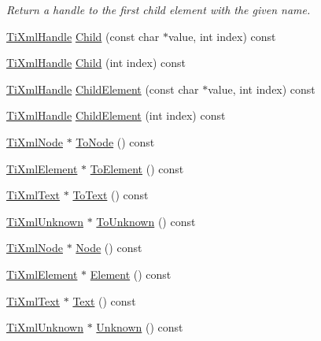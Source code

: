 \begin{DoxyCompactItemize}
\begin{DoxyCompactList}\small\item\em Return a handle to the first child element with the given name. \item\end{DoxyCompactList}\item 
\hyperlink{class_ti_xml_handle}{TiXmlHandle} \hyperlink{class_ti_xml_handle_a072492b4be1acdb0db2d03cd8f71ccc4}{Child} (const char $\ast$value, int index) const 
\item 
\hyperlink{class_ti_xml_handle}{TiXmlHandle} \hyperlink{class_ti_xml_handle_af9cf6a7d08a5da94a8924425ad0cd5ac}{Child} (int index) const 
\item 
\hyperlink{class_ti_xml_handle}{TiXmlHandle} \hyperlink{class_ti_xml_handle_a979a3f850984a176ee884e394c7eed2d}{ChildElement} (const char $\ast$value, int index) const 
\item 
\hyperlink{class_ti_xml_handle}{TiXmlHandle} \hyperlink{class_ti_xml_handle_a8786475b9d1f1518492e3a46704c7ef0}{ChildElement} (int index) const 
\item 
\hyperlink{class_ti_xml_node}{TiXmlNode} $\ast$ \hyperlink{class_ti_xml_handle_af678e5088e83be67baf76f699756f2c3}{ToNode} () const 
\item 
\hyperlink{class_ti_xml_element}{TiXmlElement} $\ast$ \hyperlink{class_ti_xml_handle_abc6e7ed383a5fe1e52b0c0004b457b9e}{ToElement} () const 
\item 
\hyperlink{class_ti_xml_text}{TiXmlText} $\ast$ \hyperlink{class_ti_xml_handle_a4ac53a652296203a5b5e13854d923586}{ToText} () const 
\item 
\hyperlink{class_ti_xml_unknown}{TiXmlUnknown} $\ast$ \hyperlink{class_ti_xml_handle_a1381c17507a130767b1e23afc93b3674}{ToUnknown} () const 
\item 
\hyperlink{class_ti_xml_node}{TiXmlNode} $\ast$ \hyperlink{class_ti_xml_handle_ab44b723a8dc9af72838a303c079d0376}{Node} () const 
\item 
\hyperlink{class_ti_xml_element}{TiXmlElement} $\ast$ \hyperlink{class_ti_xml_handle_acb5fe8388a526289ea65e817a51e05e7}{Element} () const 
\item 
\hyperlink{class_ti_xml_text}{TiXmlText} $\ast$ \hyperlink{class_ti_xml_handle_a9fc739c8a18d160006f82572fc143d13}{Text} () const 
\item 
\hyperlink{class_ti_xml_unknown}{TiXmlUnknown} $\ast$ \hyperlink{class_ti_xml_handle_a49675b74357ba2aae124657a9a1ef465}{Unknown} () const 
\end{DoxyCompactItemize}


